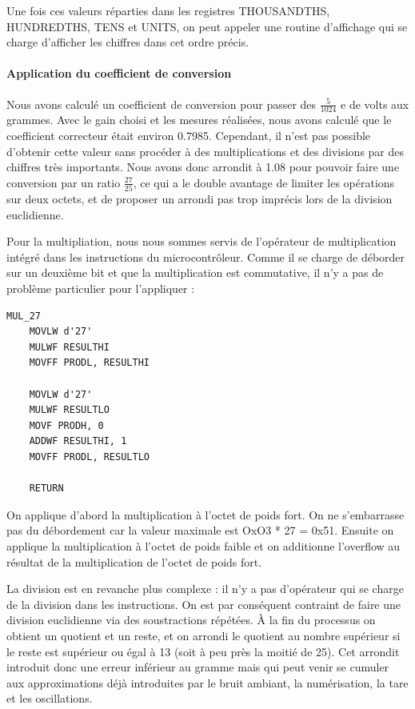 \documentclass[a4paper,11pt,titlepage]{article}
\begin{document}
Une fois ces valeurs réparties dans les registres THOUSANDTHS, HUNDREDTHS, TENS et UNITS, on peut appeler une routine d'affichage qui se charge d'afficher les chiffres dans cet ordre précis.

\paragraph{Application du coefficient de conversion}

Nous avons calculé un coefficient de conversion pour passer des $\frac{5}{1024}$ e de volts aux grammes. Avec le gain choisi et les mesures réalisées, nous avons calculé que le coefficient correcteur était environ 0.7985. Cependant, il n'est pas possible d'obtenir cette valeur sans procéder à des multiplications et des divisions par des chiffres très importants. Nous avons donc arrondit à 1.08 pour pouvoir faire une conversion par un ratio $\frac{27}{25}$, ce qui a le double avantage de limiter les opérations sur deux octets, et de proposer un arrondi pas trop imprécis lors de la division euclidienne.

Pour la multipliation, nous nous sommes servis de l'opérateur de multiplication intégré dans les instructions du microcontrôleur. Comme il se charge de déborder sur un deuxième bit et que la multiplication est commutative, il n'y a pas de problème particulier pour l'appliquer :  

\begin{lstlisting}
MUL_27
    MOVLW d'27'
    MULWF RESULTHI
    MOVFF PRODL, RESULTHI
    
    MOVLW d'27'
    MULWF RESULTLO
    MOVF PRODH, 0
    ADDWF RESULTHI, 1
    MOVFF PRODL, RESULTLO
    
    RETURN
\end{lstlisting}

On applique d'abord la multiplication à l'octet de poids fort. On ne s'embarrasse pas du débordement car la valeur maximale est OxO3 * 27 = 0x51.
Ensuite on applique la multiplication à l'octet de poids faible et on additionne l'overflow au résultat de la multiplication de l'octet de poids fort.

La division est en revanche plus complexe : il n'y a pas d'opérateur qui se charge de la division dans les instructions. On est par conséquent contraint de faire une division euclidienne via des soustractions répétées. À la fin du processus on obtient un quotient et un reste, et on arrondi le quotient au nombre supérieur si le reste est supérieur ou égal à 13 (soit à peu près la moitié de 25). Cet arrondit introduit donc une erreur inférieur au gramme mais qui peut venir se cumuler aux approximations déjà introduites par le bruit ambiant, la numérisation, la tare et les oscillations.
\end{document}
